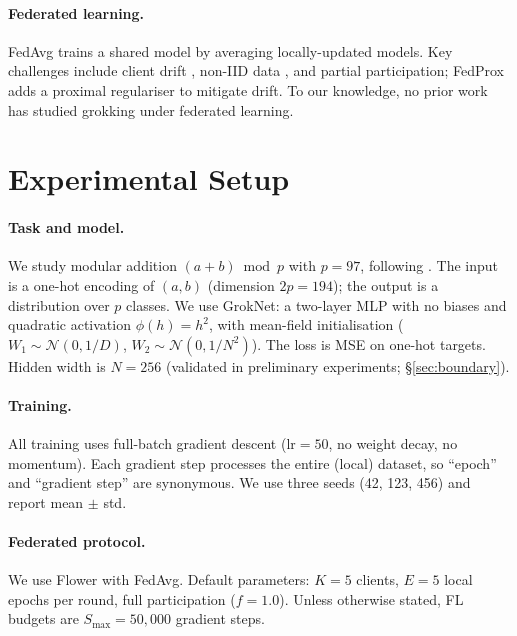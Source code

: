 \documentclass{article}
\begin{document}
\paragraph{Federated learning.}
FedAvg \citep{mcmahan2017communication} trains a shared model by averaging locally-updated models.
Key challenges include client drift \citep{karimireddy2020scaffold}, non-IID data \citep{li2020federated}, and partial participation; FedProx \citep{li2020fedprox} adds a proximal regulariser to mitigate drift.
To our knowledge, no prior work has studied grokking under federated learning.


\section{Experimental Setup}
\label{sec:setup}

\paragraph{Task and model.}
We study modular addition $(a + b) \bmod p$ with $p = 97$, following \citet{gromov2023grokking}.
The input is a one-hot encoding of $(a, b)$ (dimension $2p = 194$); the output is a distribution over $p$ classes.
We use GrokNet: a two-layer MLP with no biases and quadratic activation $\phi(h) = h^2$, with mean-field initialisation ($W_1 \sim \mathcal{N}(0, 1/D)$, $W_2 \sim \mathcal{N}(0, 1/N^2)$).
The loss is MSE on one-hot targets.
Hidden width is $N = 256$ (validated in preliminary experiments; \S\ref{sec:boundary}).

\paragraph{Training.}
All training uses full-batch gradient descent ($\mathrm{lr} = 50$, no weight decay, no momentum).
Each gradient step processes the entire (local) dataset, so ``epoch'' and ``gradient step'' are synonymous.
We use three seeds (42, 123, 456) and report mean $\pm$ std.

\paragraph{Federated protocol.}
We use Flower \citep{beutel2020flower} with FedAvg.
Default parameters: $K = 5$ clients, $E = 5$ local epochs per round, full participation ($f = 1.0$).
Unless otherwise stated, FL budgets are $S_{\max} = 50{,}000$ gradient steps.
\end{document}
